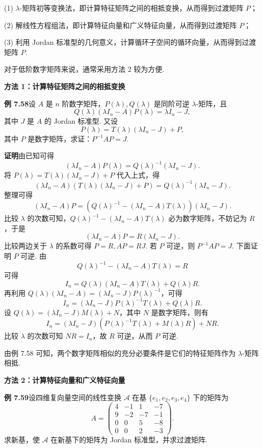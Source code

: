 \documentclass[UTF8, 12pt, fontset=fandol, oneside]{ctexart}
\begin{document}
(1) $\lambda$-矩阵初等变换法，即计算特征矩阵之间的相抵变换，从而得到过渡矩阵 $P$；

(2) 解线性方程组法，即计算特征向量和广义特征向量，从而得到过渡矩阵 $P$；

(3) 利用 Jordan 标准型的几何意义，计算循环子空间的循环向量，从而得到过渡矩阵 $P$.

对于低阶数字矩阵来说，通常采用方法 2 较为方便.

\noindent\textbf{方法 1：计算特征矩阵之间的相抵变换}

\noindent\textbf{例 7.58}\quad 设 $A$ 是 $n$ 阶数字矩阵，$P(\lambda),Q(\lambda)$ 是同阶可逆 $\lambda$-矩阵，且
\[
Q(\lambda)(\lambda I_n-A)P(\lambda)=\lambda I_n-J,
\]
其中 $J$ 是 $A$ 的 Jordan 标准型. 又设
\[
P(\lambda)=T(\lambda)(\lambda I_n-J)+P,
\]
其中 $P$ 是数字矩阵，求证：$P^{-1}AP=J$.

\noindent\textbf{证明}\quad 由已知可得
\[
(\lambda I_n-A)P(\lambda)=Q(\lambda)^{-1}(\lambda I_n-J).
\]
将 $P(\lambda)=T(\lambda)(\lambda I_n-J)+P$ 代入上式，得
\[
(\lambda I_n-A)(T(\lambda)(\lambda I_n-J)+P)=Q(\lambda)^{-1}(\lambda I_n-J).
\]
整理可得
\[
(\lambda I_n-A)P=(Q(\lambda)^{-1}-(\lambda I_n-A)T(\lambda))(\lambda I_n-J).
\]
比较 $\lambda$ 的次数可知，$Q(\lambda)^{-1}-(\lambda I_n-A)T(\lambda)$ 必为数字矩阵，不妨记为 $R$，于是
\[
(\lambda I_n-A)P=R(\lambda I_n-J).
\]
比较两边关于 $\lambda$ 的系数可得 $P=R,AP=RJ$. 若 $P$ 可逆，则 $P^{-1}AP=J$. 下面证明 $P$ 可逆. 由
\[
Q(\lambda)^{-1}-(\lambda I_n-A)T(\lambda)=R
\]
可得
\[
I_n=Q(\lambda)(\lambda I_n-A)T(\lambda)+Q(\lambda)R.
\]
再利用 $Q(\lambda)(\lambda I_n-A)=(\lambda I_n-J)P(\lambda)^{-1}$，可得
\[
I_n=(\lambda I_n-J)P(\lambda)^{-1}T(\lambda)+Q(\lambda)R.
\]
设 $Q(\lambda)=(\lambda I_n-J)M(\lambda)+N$，其中 $N$ 是数字矩阵，则有
\[
I_n=(\lambda I_n-J)(P(\lambda)^{-1}T(\lambda)+M(\lambda)R)+NR.
\]
比较 $\lambda$ 的次数可知 $NR=I_n$，故 $R$ 可逆，从而 $P$ 可逆.

由例 7.58 可知，两个数字矩阵相似的充分必要条件是它们的特征矩阵作为 $\lambda$-矩阵相抵.

\noindent\textbf{方法 2：计算特征向量和广义特征向量}

\noindent\textbf{例 7.59}\quad 设四维复向量空间的线性变换 $\mathcal{A}$ 在基 $\{e_1,e_2,e_3,e_4\}$ 下的矩阵为
\[
A=\left(\begin{array}{rrrr}
4&-1&1&-7\\
9&-2&-7&-1\\
0&0&5&-8\\
0&0&2&-3
\end{array}\right).
\]
求新基，使 $\mathcal{A}$ 在新基下的矩阵为 Jordan 标准型，并求过渡矩阵.
\end{document}
